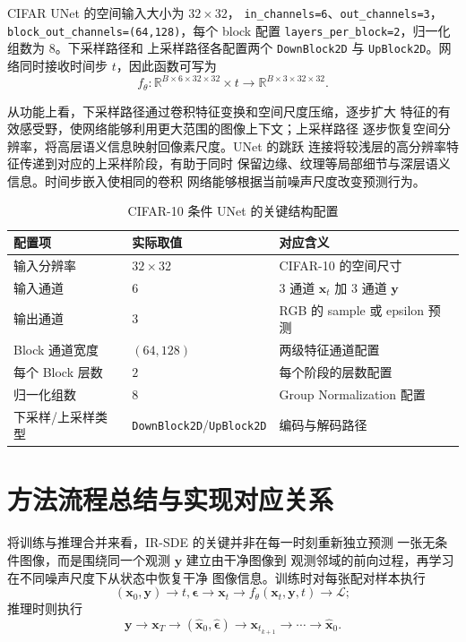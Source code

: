 \documentclass[UTF8,a4paper,12pt]{ctexart}
\begin{document}
CIFAR UNet 的空间输入大小为 \(32\times32\)，
\texttt{in\_channels=6}、\texttt{out\_channels=3}，
\texttt{block\_out\_channels=(64,128)}，每个 block 配置
\texttt{layers\_per\_block=2}，归一化组数为 \(8\)。下采样路径和
上采样路径各配置两个 \texttt{DownBlock2D} 与
\texttt{UpBlock2D}。网络同时接收时间步 \(t\)，因此函数可写为
\[
  f_\theta:
  \mathbb{R}^{B\times6\times32\times32}\times t
  \longrightarrow
  \mathbb{R}^{B\times3\times32\times32}.
\]

从功能上看，下采样路径通过卷积特征变换和空间尺度压缩，逐步扩大
特征的有效感受野，使网络能够利用更大范围的图像上下文；上采样路径
逐步恢复空间分辨率，将高层语义信息映射回像素尺度。UNet 的跳跃
连接将较浅层的高分辨率特征传递到对应的上采样阶段，有助于同时
保留边缘、纹理等局部细节与深层语义信息。时间步嵌入使相同的卷积
网络能够根据当前噪声尺度改变预测行为。

\begin{table}[htbp]
\centering
\caption{CIFAR-10 条件 UNet 的关键结构配置}
\label{tab:unet}
\begin{tabular}{lll}
\toprule
配置项 & 实际取值 & 对应含义 \\
\midrule
输入分辨率 & \(32\times32\) & CIFAR-10 的空间尺寸 \\
输入通道 & \(6\) & \(3\) 通道 \(\bm{x}_t\) 加 \(3\) 通道 \(\bm{y}\) \\
输出通道 & \(3\) & RGB 的 sample 或 epsilon 预测 \\
Block 通道宽度 & \((64,128)\) & 两级特征通道配置 \\
每个 Block 层数 & \(2\) & 每个阶段的层数配置 \\
归一化组数 & \(8\) & Group Normalization 配置 \\
下采样/上采样类型
& \texttt{DownBlock2D}/\texttt{UpBlock2D}
& 编码与解码路径 \\
\bottomrule
\end{tabular}
\end{table}

\section{方法流程总结与实现对应关系}

将训练与推理合并来看，IR-SDE 的关键并非在每一时刻重新独立预测
一张无条件图像，而是围绕同一个观测 \(\bm{y}\) 建立由干净图像到
观测邻域的前向过程，再学习在不同噪声尺度下从状态中恢复干净
图像信息。训练时对每张配对样本执行
\[
  (\bm{x}_0,\bm{y})
  \longrightarrow
  t,\bm{\epsilon}
  \longrightarrow
  \bm{x}_t
  \longrightarrow
  f_\theta(\bm{x}_t,\bm{y},t)
  \longrightarrow
  \mathcal{L};
\]
推理时则执行
\[
  \bm{y}
  \longrightarrow
  \bm{x}_T
  \longrightarrow
  (\widehat{\bm{x}}_0,\widehat{\bm{\epsilon}})
  \longrightarrow
  \bm{x}_{t_{k+1}}
  \longrightarrow\cdots\longrightarrow
  \widehat{\bm{x}}_0.
\]
\end{document}
